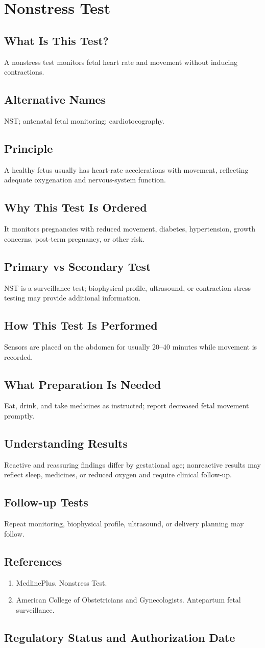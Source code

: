 \chapter{Nonstress Test}
\section*{What Is This Test?} A nonstress test monitors fetal heart rate and movement without inducing contractions.\section*{Alternative Names} NST; antenatal fetal monitoring; cardiotocography.\section*{Principle} A healthy fetus usually has heart-rate accelerations with movement, reflecting adequate oxygenation and nervous-system function.\section*{Why This Test Is Ordered} It monitors pregnancies with reduced movement, diabetes, hypertension, growth concerns, post-term pregnancy, or other risk.\section*{Primary vs Secondary Test} NST is a surveillance test; biophysical profile, ultrasound, or contraction stress testing may provide additional information.\section*{How This Test Is Performed} Sensors are placed on the abdomen for usually 20--40 minutes while movement is recorded.\section*{What Preparation Is Needed} Eat, drink, and take medicines as instructed; report decreased fetal movement promptly.\section*{Understanding Results} Reactive and reassuring findings differ by gestational age; nonreactive results may reflect sleep, medicines, or reduced oxygen and require clinical follow-up.\section*{Follow-up Tests} Repeat monitoring, biophysical profile, ultrasound, or delivery planning may follow.\section*{References} \begin{enumerate}\item MedlinePlus. Nonstress Test.\item American College of Obstetricians and Gynecologists. Antepartum fetal surveillance.\end{enumerate}\clearpage\section*{Regulatory Status and Authorization Date}\clearpage
